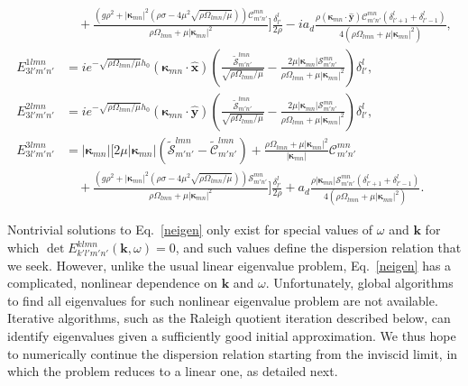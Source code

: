 \documentclass[aps,pre,amsmath,amssymb,floatfix,onecolumn,notitlepage,10pt]{revtex4-1}
\begin{document}
\begin{align}
&\quad + \frac{\left(g \rho ^2+\left\lvert \bm{\kappa}_{m n} \right\rvert^2 \left(\rho  \sigma -4 \mu ^2 \sqrt{{\rho  \Omega _{l m n}}/{\mu }}\right)\right)\mathcal{C}_{m' n'}^{m n} }{\rho  \Omega _{l m n}+\mu  \left\lvert \bm{\kappa}_{m n} \right\rvert^2} \Bigg] \frac{\delta^l_{l'}}{2\rho} - i a_d \frac{\rho \left( \bm{\kappa}_{mn}\cdot\hat{\mathbf{y}} \right) \mathcal{C}_{m' n'}^{m n} \left(\delta^l_{l'+1}+\delta^l_{l'-1}\right)}{4\left(\rho  \Omega _{l m n}+\mu  \left\lvert \bm{\kappa}_{m n} \right\rvert^2\right)}, \\
E_{3l'm'n'}^{1lmn} &=i e^ {-\sqrt{{\rho  \Omega _{l m n}}/{\mu }}h_0} \left( \bm{\kappa}_{mn}\cdot\hat{\mathbf{x}} \right) \left(\frac{\tilde{\mathcal{S}}_{m' n'}^{l m n}}{\sqrt{{\rho  \Omega _{l m n}}/{\mu }}}-\frac{2 \mu  \left\lvert \bm{\kappa}_{m n} \right\rvert \mathcal{S}_{m' n'}^{m n}}{\rho  \Omega _{l m n}+\mu  \left\lvert \bm{\kappa}_{m n} \right\rvert^2}\right) \delta^l_{l'},  \\
E_{3l'm'n'}^{2lmn} &=i e^ {-\sqrt{{\rho  \Omega _{l m n}}/{\mu }}h_0} \left( \bm{\kappa}_{mn}\cdot\hat{\mathbf{y}} \right) \left(\frac{\tilde{\mathcal{S}}_{m' n'}^{l m n}}{\sqrt{{\rho  \Omega _{l m n}}/{\mu }}}-\frac{2 \mu  \left\lvert \bm{\kappa}_{m n} \right\rvert \mathcal{S}_{m' n'}^{m n}}{\rho  \Omega _{l m n}+\mu  \left\lvert \bm{\kappa}_{m n} \right\rvert^2}\right) \delta^l_{l'}, \\
E_{3l'm'n'}^{3lmn} &= \left\lvert \bm{\kappa}_{m n} \right\rvert \Bigg[ 2 \mu  \left\lvert \bm{\kappa}_{m n} \right\rvert \left( \tilde{\mathcal{S}}_{m' n'}^{l m n} - \tilde{\mathcal{C}}_{m' n'}^{l m n}  \right) + \frac{\rho  \Omega _{l m n}+\mu  \left\lvert \bm{\kappa}_{m n} \right\rvert^2}{\left\lvert \bm{\kappa}_{m n} \right\rvert } \mathcal{C}_{m' n'}^{m n}  \nonumber \\
&\quad+\frac{\left(g \rho ^2+\left\lvert \bm{\kappa}_{m n} \right\rvert^2 \left(\rho  \sigma -4 \mu ^2 \sqrt{{\rho  \Omega _{l m n}}/{\mu }}\right)\right) \mathcal{S}_{m' n'}^{m n}  }{\rho  \Omega _{l m n}+\mu  \left\lvert \bm{\kappa}_{m n} \right\rvert^2}\Bigg]  \frac{\delta^l_{l'}}{2\rho} +a_d\frac{\rho \left\lvert \bm{\kappa}_{m n} \right\rvert \mathcal{S}_{m' n'}^{m n} \left(\delta^l_{l'+1}+\delta^l_{l'-1}\right)}{4\left(\rho  \Omega _{l m n}+\mu  \left\lvert \bm{\kappa}_{m n} \right\rvert^2\right)}.
\end{align}

Nontrivial solutions to Eq.~\eqref{neigen} only exist for special values of $\omega$ and $\mathbf{k}$ for which $\det E_{k'l'm'n'}^{klmn}(\mathbf{k},\omega)=0$, and such values define the dispersion relation that we seek. However, unlike the usual linear eigenvalue problem, Eq.~\eqref{neigen} has a complicated, nonlinear dependence on $\mathbf{k}$ and $\omega$. Unfortunately, global algorithms to find all eigenvalues for such nonlinear eigenvalue problem are not available. Iterative algorithms, such as the Raleigh quotient iteration described below, can identify eigenvalues given a sufficiently good initial approximation. We thus hope to numerically continue the dispersion relation starting from the inviscid limit, in which the problem reduces to a linear one, as detailed next.
\end{document}
